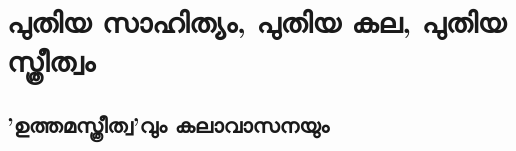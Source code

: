 \chapter{പുതിയ സാഹിത്യം, പുതിയ കല, പുതിയ സ്ത്രീത്വം}
\label{chapter9} 

\section{'ഉത്തമസ്ത്രീത്വ'വും കലാവാസനയും}
\label{ch9sec1}